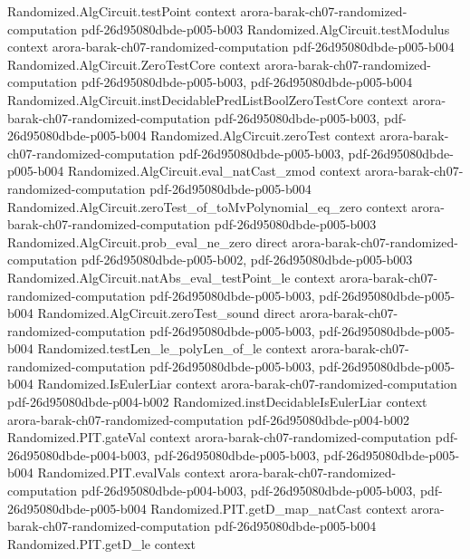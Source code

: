 \begin{theorem}
  {Randomized.AlgCircuit.testPoint}
  {context}
  {arora-barak-ch07-randomized-computation}
  {pdf-26d95080dbde-p005-b003}
\proofstep
  {Randomized.AlgCircuit.testModulus}
  {context}
  {arora-barak-ch07-randomized-computation}
  {pdf-26d95080dbde-p005-b004}
\proofstep
  {Randomized.AlgCircuit.ZeroTestCore}
  {context}
  {arora-barak-ch07-randomized-computation}
  {pdf-26d95080dbde-p005-b003,
    pdf-26d95080dbde-p005-b004}
\proofstep
  {Randomized.AlgCircuit.instDecidablePredListBoolZeroTestCore}
  {context}
  {arora-barak-ch07-randomized-computation}
  {pdf-26d95080dbde-p005-b003,
    pdf-26d95080dbde-p005-b004}
\proofstep
  {Randomized.AlgCircuit.zeroTest}
  {context}
  {arora-barak-ch07-randomized-computation}
  {pdf-26d95080dbde-p005-b003,
    pdf-26d95080dbde-p005-b004}
\proofstep
  {Randomized.AlgCircuit.eval_natCast_zmod}
  {context}
  {arora-barak-ch07-randomized-computation}
  {pdf-26d95080dbde-p005-b004}
\proofstep
  {Randomized.AlgCircuit.zeroTest_of_toMvPolynomial_eq_zero}
  {context}
  {arora-barak-ch07-randomized-computation}
  {pdf-26d95080dbde-p005-b003}
\proofstep
  {Randomized.AlgCircuit.prob_eval_ne_zero}
  {direct}
  {arora-barak-ch07-randomized-computation}
  {pdf-26d95080dbde-p005-b002,
    pdf-26d95080dbde-p005-b003}
\proofstep
  {Randomized.AlgCircuit.natAbs_eval_testPoint_le}
  {context}
  {arora-barak-ch07-randomized-computation}
  {pdf-26d95080dbde-p005-b003,
    pdf-26d95080dbde-p005-b004}
\proofstep
  {Randomized.AlgCircuit.zeroTest_sound}
  {direct}
  {arora-barak-ch07-randomized-computation}
  {pdf-26d95080dbde-p005-b003,
    pdf-26d95080dbde-p005-b004}
\proofstep
  {Randomized.testLen_le_polyLen_of_le}
  {context}
  {arora-barak-ch07-randomized-computation}
  {pdf-26d95080dbde-p005-b003,
    pdf-26d95080dbde-p005-b004}
\proofstep
  {Randomized.IsEulerLiar}
  {context}
  {arora-barak-ch07-randomized-computation}
  {pdf-26d95080dbde-p004-b002}
\proofstep
  {Randomized.instDecidableIsEulerLiar}
  {context}
  {arora-barak-ch07-randomized-computation}
  {pdf-26d95080dbde-p004-b002}
\proofstep
  {Randomized.PIT.gateVal}
  {context}
  {arora-barak-ch07-randomized-computation}
  {pdf-26d95080dbde-p004-b003,
    pdf-26d95080dbde-p005-b003,
    pdf-26d95080dbde-p005-b004}
\proofstep
  {Randomized.PIT.evalVals}
  {context}
  {arora-barak-ch07-randomized-computation}
  {pdf-26d95080dbde-p004-b003,
    pdf-26d95080dbde-p005-b003,
    pdf-26d95080dbde-p005-b004}
\proofstep
  {Randomized.PIT.getD_map_natCast}
  {context}
  {arora-barak-ch07-randomized-computation}
  {pdf-26d95080dbde-p005-b004}
\proofstep
  {Randomized.PIT.getD_le}
  {context}

\end{theorem}

